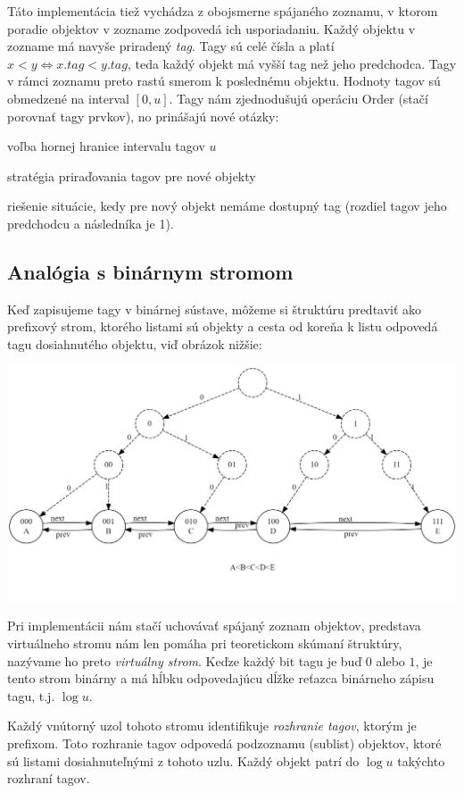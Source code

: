 \documentclass[
  digital,     %
  oneside,     %
  nosansbold,  %
  nocolorbold, %
  lof,         %
  lot,         %
]{fithesis4}
\begin{document}
Táto implementácia tiež vychádza z obojsmerne spájaného zoznamu, v ktorom poradie objektov v zozname zodpovedá ich usporiadaniu. Každý objektu v zozname má navyše priradený \textit{tag}. Tagy sú celé čísla a platí $x < y \iff x.tag < y.tag$, teda každý objekt má vyšší tag než jeho predchodca. Tagy v rámci zoznamu preto rastú smerom k poslednému objektu. Hodnoty tagov sú obmedzené na interval $[0, u]$. Tagy nám zjednodušujú operáciu Order (stačí porovnať tagy prvkov), no prinášajú nové otázky:
\begin{compactenum}
  \item voľba hornej hranice intervalu tagov $u$
  \item stratégia priraďovania tagov pre nové objekty
  \item riešenie situácie, kedy pre nový objekt nemáme dostupný tag (rozdiel tagov jeho predchodcu a následníka je 1).
\end{compactenum}

\subsection{Analógia s binárnym stromom}
Keď zapisujeme tagy v binárnej sústave, môžeme si štruktúru predtaviť ako prefixový strom, ktorého listami sú objekty a cesta od koreňa k listu odpovedá tagu dosiahnutého objektu, viď obrázok nižšie:

\includegraphics[width=\textwidth]{graphics/graphviz.png}

Pri implementácii nám stačí uchovávať spájaný zoznam objektov, predstava virtuálneho stromu nám len pomáha pri teoretickom skúmaní štruktúry, nazývame ho preto \textit{virtuálny strom}. Keďze každý bit tagu je buď $0$ alebo $1$, je tento strom binárny a má hĺbku odpovedajúcu dĺžke reťazca binárneho zápisu tagu, t.j. $\log{u}$.

Každý vnútorný uzol tohoto stromu identifikuje \textit{rozhranie tagov}, ktorým je prefixom. Toto rozhranie tagov odpovedá podzoznamu (sublist) objektov, ktoré sú listami dosiahnuteľnými z tohoto uzlu. Každý objekt patrí do $\log{u}$ takýchto rozhraní tagov.
\end{document}
